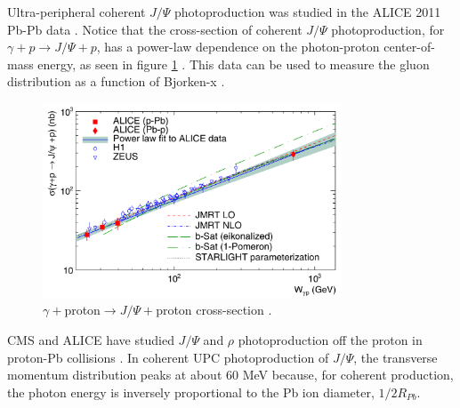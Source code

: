 Ultra-peripheral coherent $J/\Psi$ photoproduction was studied in the ALICE 2011 Pb-Pb data \cite{Abelev:2012ba}. Notice that the cross-section of coherent $J/\Psi$ photoproduction, for $\gamma+p\rightarrow J/\Psi+p$, has a power-law dependence on the photon-proton center-of-mass energy, as seen in figure \ref{fig:aliceData1} \cite{Klein:2017nqo}. This data can be used to measure the gluon distribution as a function of Bjorken-x \cite{pQCD2011.08}.

\begin{figure}[h!]
\begin{centering}
\includegraphics[width=3.5in]{Chapter2/importfigs/alice_jpsi_data.png}
\par\end{centering}
\caption{$\gamma +$proton$\rightarrow J/\Psi +$proton cross-section \cite{Klein:2017nqo}. \label{fig:aliceData1}}
\end{figure}

CMS and ALICE have studied $J/\Psi$ and $\rho$ photoproduction off the proton in proton-Pb collisions \cite{TheALICE:2014dwa}. In coherent UPC photoproduction of $J/\Psi$, the transverse momentum distribution peaks at about 60 MeV because, for coherent production, the photon energy is inversely proportional to the Pb ion diameter, $1/2R_{Pb}$.

